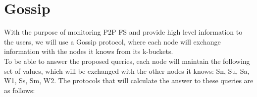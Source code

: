 \documentclass[times,9pt,article]{llncs}
\begin{document}
\section{Gossip}

With the purpose of monitoring P2P FS and provide high level information to the 
users, we will use a Gossip protocol, where each node will exchange information
with the nodes it knows from its k-buckets.\\
To be able to answer the proposed queries, each node will maintain the following
set of values, which will be exchanged with the other nodes it knows: Sn, Su, Sa,
W1, Ss, Sm, W2. The protocols that will calculate the answer to these queries are
as follows:
\end{document}
